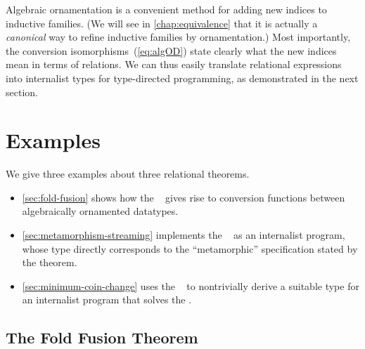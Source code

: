 Algebraic ornamentation is a convenient method for adding new indices to inductive families.
(We will see in \autoref{chap:equivalence} that it is actually a \emph{canonical} way to refine inductive families by ornamentation.)
Most importantly, the conversion isomorphisms~(\ref{eq:algOD}) state clearly what the new indices mean in terms of relations.
We can thus easily translate relational expressions into internalist types for type-directed programming, as demonstrated in the next section.

\section{Examples}
\label{sec:internalism-examples}

We give three examples about three relational theorems.
\begin{itemize}
\item \autoref{sec:fold-fusion} shows how the ~\citep[Section~6.2]{Bird-AoP} gives rise to conversion functions between algebraically ornamented datatypes.
\item \autoref{sec:metamorphism-streaming} implements the ~\citep[Theorem~30]{Bird-arithmetic-coding} as an internalist program, whose type directly corresponds to the ``metamorphic'' specification stated by the theorem.
\item \autoref{sec:minimum-coin-change} uses the ~\citep[Theorem~10.1]{Bird-AoP} to nontrivially derive a suitable type for an internalist program that solves the .
\end{itemize}

\subsection{The Fold Fusion Theorem}
\label{sec:fold-fusion}

